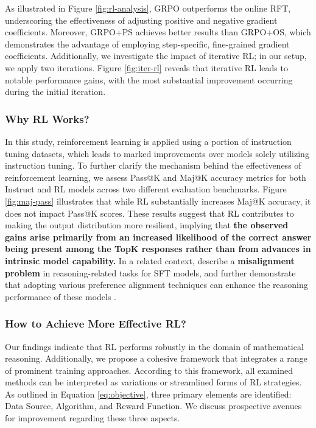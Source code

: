 \begin{itemize}[topsep=0pt]
\begin{itemize}[topsep=0pt]
As illustrated in Figure \ref{fig:rl-analysis}, GRPO outperforms the online RFT, underscoring the effectiveness of adjusting positive and negative gradient coefficients. Moreover, GRPO+PS achieves better results than GRPO+OS, which demonstrates the advantage of employing step-specific, fine-grained gradient coefficients. Additionally, we investigate the impact of iterative RL; in our setup, we apply two iterations. Figure \ref{fig:iter-rl} reveals that iterative RL leads to notable performance gains, with the most substantial improvement occurring during the initial iteration.

\subsubsection{Why RL Works?} In this study, reinforcement learning is applied using a portion of instruction tuning datasets, which leads to marked improvements over models solely utilizing instruction tuning. To further clarify the mechanism behind the effectiveness of reinforcement learning, we assess Pass@K and Maj@K accuracy metrics for both Instruct and RL models across two different evaluation benchmarks. Figure \ref{fig:maj-pass} illustrates that while RL substantially increases Maj@K accuracy, it does not impact Pass@K scores. These results suggest that RL contributes to making the output distribution more resilient, implying that \textbf{the observed gains arise primarily from an increased likelihood of the correct answer being present among the TopK responses rather than from advances in intrinsic model capability.} In a related context, \citep{wang2023making} describe a \textbf{misalignment problem} in reasoning-related tasks for SFT models, and further demonstrate that adopting various preference alignment techniques can enhance the reasoning performance of these models \citep{yuan2023rrhf,song2023preference,wang2023making}.

\subsubsection{How to Achieve More Effective RL?}
\label{sec:effec_rl}
Our findings indicate that RL performs robustly in the domain of mathematical reasoning. Additionally, we propose a cohesive framework that integrates a range of prominent training approaches. According to this framework, all examined methods can be interpreted as variations or streamlined forms of RL strategies. As outlined in Equation \ref{eq:objective}, three primary elements are identified: Data Source, Algorithm, and Reward Function. We discuss prospective avenues for improvement regarding these three aspects.


\end{itemize}
\end{itemize}
